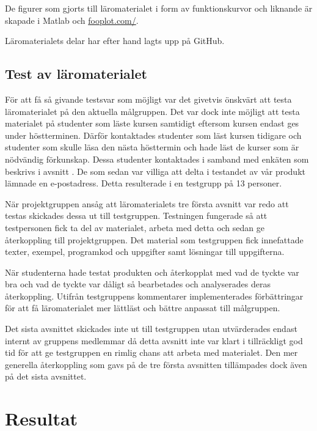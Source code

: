 \documentclass[12pt,a4paper,twoside,openright]{article}
\begin{document}
De figurer som gjorts till läromaterialet i form av funktionskurvor
och liknande är skapade i Matlab och \url{fooplot.com/}.

Läromaterialets delar har efter hand lagts upp på GitHub.

\subsection{Test av läromaterialet}
\label{sec:test}

För att få så givande testsvar som möjligt var det givetvis önskvärt
att testa läromaterialet på den aktuella målgruppen. Det var dock inte
möjligt att testa materialet på studenter som läste kursen samtidigt
eftersom kursen endast ges under höstterminen. Därför kontaktades
studenter som läst kursen tidigare och studenter som skulle läsa den
nästa hösttermin och hade läst de kurser som är nödvändig förkunskap.
Dessa studenter kontaktades i samband med enkäten som beskrivs i
avsnitt . De som sedan var villiga att
delta i testandet av vår produkt lämnade en e-postadress. Detta
resulterade i en testgrupp på 13 personer.

När projektgruppen ansåg att läromaterialets tre första avsnitt var
redo att testas skickades dessa ut till testgruppen. Testningen
fungerade så att testpersonen fick ta del av materialet, arbeta med
detta och sedan ge återkoppling till projektgruppen.  Det material som
testgruppen fick innefattade texter, exempel, programkod och uppgifter
samt lösningar till uppgifterna.

När studenterna hade testat produkten och återkopplat med vad de
tyckte var bra och vad de tyckte var dåligt så bearbetades och
analyserades deras återkoppling. Utifrån testgruppens kommentarer
implementerades förbättringar för att få läromaterialet mer lättläst
och bättre anpassat till målgruppen.

Det sista avsnittet skickades inte ut till testgruppen utan
utvärderades endast internt av gruppens medlemmar då detta avsnitt
inte var klart i tillräckligt god tid för att ge testgruppen en rimlig
chans att arbeta med materialet. Den mer generella återkoppling som gavs
på de tre första avsnitten tillämpades dock även på det sista
avsnittet.

\newpage

\section{Resultat}
\end{document}
